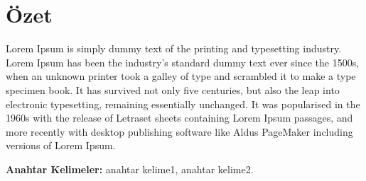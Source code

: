 \chapter*{Özet}

Lorem Ipsum is simply dummy text of the printing and typesetting industry. Lorem Ipsum has been the industry's standard dummy text ever since the 1500s, when an unknown printer took a galley of type and scrambled it to make a type specimen book. It has survived not only five centuries, but also the leap into electronic typesetting, remaining essentially unchanged. It was popularised in the 1960s with the release of Letraset sheets containing Lorem Ipsum passages, and more recently with desktop publishing software like Aldus PageMaker including versions of Lorem Ipsum.

\vfill
\textbf{Anahtar Kelimeler:} anahtar kelime1, anahtar kelime2.
\clearpage
